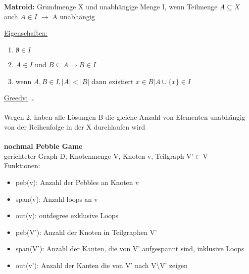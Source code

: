\documentclass[12pt,a4paper]{article}
\begin{document}
\\\\
\parbox{\linewidth}{
\textbf{Matroid:} Grundmenge X und unabhängige Menge I, wenn Teilmenge $A\subseteq X$ auch $A \in I$ $\rightarrow$ A unabhängig

\underline{Eigenschaften:}
\begin{enumerate}
	\item $\emptyset \in I$
	\item $A \in I$ und $B \subseteq A \Rightarrow B \in I$
	\item wenn $A,B \in I, |A| < |B|$ dann existiert $x \in B | A \cup \{x\} \in I$
\end{enumerate}
}
\underline{Greedy:} …
\\\\
Wegen 2. haben alle Lösungen B die gleiche Anzahl von Elementen unabhängig von der Reihenfolge in der X durchlaufen wird
\\\\
\textbf{nochmal Pebble Game}\\
gerichteter Graph D, Knotenmenge V, Knoten v, Teilgraph V'$\subset$V\\
Funktionen:
\begin{itemize}
	\item peb(v): Anzahl der Pebbles an Knoten v
	\item span(v): Anzahl loops an v
	\item out(v): outdegree exklusive Loops
	\item peb(V'): Anzahl der Knoten in Teilgraphen V'
	\item span(V'): Anzahl der Kanten, die von V' aufgespannt sind, inklusive Loops
	\item out(v'): Anzahl der Kanten die von V' nach V\textbackslash V' zeigen
\end{itemize}

\\\\
\end{document}

